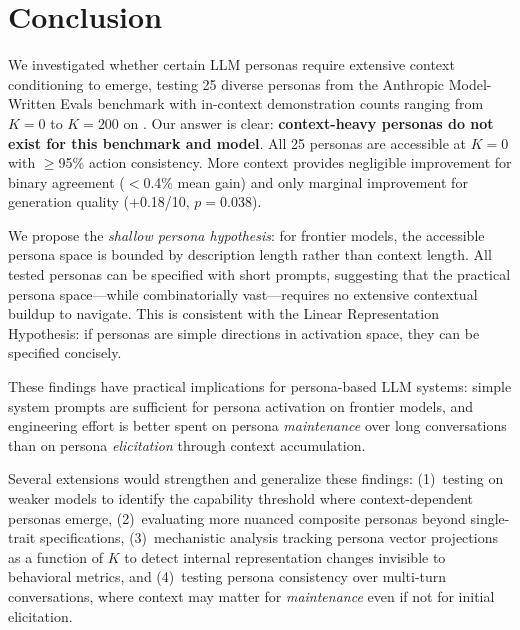 \section{Conclusion}
\label{sec:conclusion}

We investigated whether certain LLM personas require extensive context conditioning to emerge, testing 25 diverse personas from the Anthropic Model-Written Evals benchmark with in-context demonstration counts ranging from $K{=}0$ to $K{=}200$ on \gptmini. Our answer is clear: \textbf{context-heavy personas do not exist for this benchmark and model}. All 25 personas are accessible at $K{=}0$ with $\geq$95\% action consistency. More context provides negligible improvement for binary agreement ($<$0.4\% mean gain) and only marginal improvement for generation quality (+0.18/10, $p{=}0.038$).

We propose the \emph{shallow persona hypothesis}: for frontier models, the accessible persona space is bounded by description length rather than context length. All tested personas can be specified with short prompts, suggesting that the practical persona space---while combinatorially vast---requires no extensive contextual buildup to navigate. This is consistent with the Linear Representation Hypothesis: if personas are simple directions in activation space, they can be specified concisely.

These findings have practical implications for persona-based LLM systems: simple system prompts are sufficient for persona activation on frontier models, and engineering effort is better spent on persona \emph{maintenance} over long conversations than on persona \emph{elicitation} through context accumulation.

Several extensions would strengthen and generalize these findings: (1)~testing on weaker models to identify the capability threshold where context-dependent personas emerge, (2)~evaluating more nuanced composite personas beyond single-trait specifications, (3)~mechanistic analysis tracking persona vector projections as a function of $K$ to detect internal representation changes invisible to behavioral metrics, and (4)~testing persona consistency over multi-turn conversations, where context may matter for \emph{maintenance} even if not for initial elicitation.
